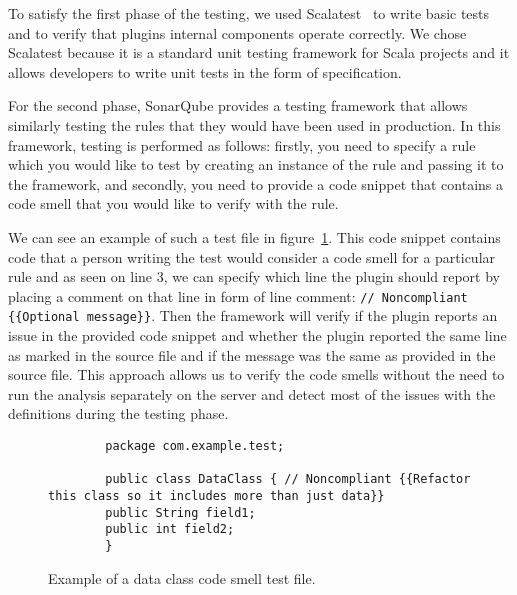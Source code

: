 To satisfy the first phase of the testing, we used Scalatest~\cite{scalatest} to write basic tests and to verify
that plugins internal components operate correctly.
We chose Scalatest because it is a standard unit testing framework for Scala projects and it allows developers
to write unit tests in the form of specification.

For the second phase, SonarQube provides a testing framework that allows similarly testing the rules that
they would have been used in production.
In this framework, testing is performed as follows: firstly, you need to specify a rule which you would like to test by
creating an instance of the rule and passing it to the framework, and secondly, you need to provide a code snippet that
contains a code smell that you would like to verify with the rule.

We can see an example of such a test file in figure~\ref{data_class_example}.
This code snippet contains code that a person writing the test would consider a code smell for a particular rule
and as seen on line 3, we can specify which line the plugin should report by placing a comment on that line in form of line comment:
\verb|// Noncompliant {{Optional message}}|.
Then the framework will verify if the plugin reports an issue in the provided code snippet and whether the plugin reported
the same line as marked in the source file and if the message was the same as provided in the source file.
This approach allows us to verify the code smells without the need to run the analysis separately on the server and
detect most of the issues with the definitions during the testing phase.

\begin{figure} [htb]
    \begin{lstlisting}
        package com.example.test;

        public class DataClass { // Noncompliant {{Refactor this class so it includes more than just data}}
        public String field1;
        public int field2;
        }
    \end{lstlisting}
    \caption{Example of a data class code smell test file.}
    \label{data_class_example}
\end{figure}
